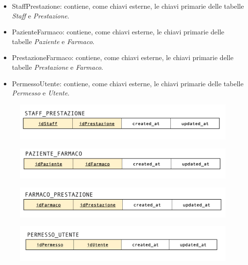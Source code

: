 \documentclass[paper=a4, fontsize=11pt,x11names]{report}
\begin{document}
\begin{itemize}
\item StaffPrestazione: contiene, come chiavi esterne, le chiavi primarie delle tabelle \textit{Staff} e \textit{Prestazione}.
\item PazienteFarmaco: contiene, come chiavi esterne, le chiavi primarie delle tabelle \textit{Paziente} e \textit{Farmaco}.
\item PrestazioneFarmaco: contiene, come chiavi esterne, le chiavi primarie delle tabelle \textit{Prestazione} e \textit{Farmaco}.
\item PermessoUtente: contiene, come chiavi esterne, le chiavi primarie delle tabelle \textit{Permesso} e \textit{Utente}.
\end{itemize}

\begin{figure}[H]
\begin{center}
\includegraphics[scale=0.3]{staffPrestazioneSchema}
\end{center}
\end{figure}

\begin{figure}[H]
\begin{center}
\includegraphics[scale=0.3]{pazienteFarmacoSchema}
\end{center}
\end{figure}

\begin{figure}[H]
\begin{center}
\includegraphics[scale=0.3]{farmacoPrestazioneSchema}
\end{center}
\end{figure}

\begin{figure}[H]
\begin{center}
\includegraphics[scale=0.3]{permessiUtenteSchema}
\end{center}
\end{figure}
\end{document}
